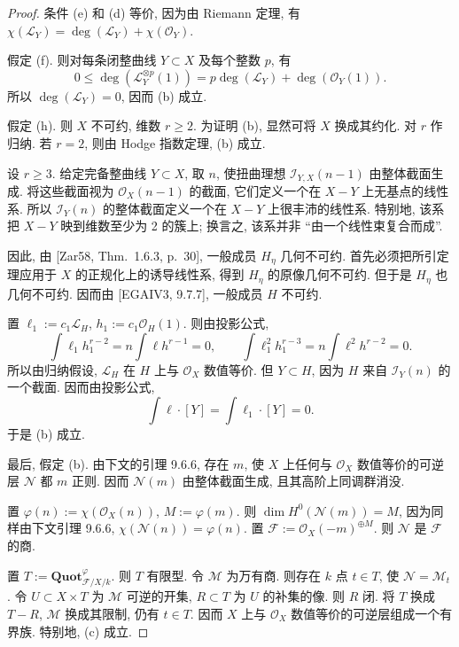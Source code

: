 \begin{proof}
条件 (e) 和 (d) 等价, 因为由 Riemann 定理, 有 $\chi(\mathcal L_Y)=\deg(\mathcal L_Y)+\chi(\mathcal O_Y)$.

假定 (f). 则对每条闭整曲线 $Y\subset X$ 及每个整数 $p$, 有
\[0\leq\deg(\mathcal L_Y^{\otimes p}(1))=p\deg(\mathcal L_Y)+\deg(\mathcal O_Y(1)).\]
所以 $\deg(\mathcal L_Y)=0$, 因而 (b) 成立.

假定 (h). 则 $X$ 不可约, 维数 $r\geq2$. 为证明 (b), 显然可将 $X$ 换成其约化. 对 $r$ 作归纳. 若 $r=2$, 则由 Hodge 指数定理, (b) 成立.

设 $r\geq3$. 给定完备整曲线 $Y\subset X$, 取 $n$, 使扭曲理想 $\mathcal I_{Y,X}(n-1)$ 由整体截面生成. 将这些截面视为 $\mathcal O_X(n-1)$ 的截面, 它们定义一个在 $X-Y$ 上无基点的线性系. 所以 $\mathcal I_Y(n)$ 的整体截面定义一个在 $X-Y$ 上很丰沛的线性系. 特别地, 该系把 $X-Y$ 映到维数至少为 2 的簇上; 换言之, 该系并非 ``由一个线性束复合而成''.

因此, 由 [Zar58, Thm.~1.6.3, p.~30], 一般成员 $H_\eta$ 几何不可约. 首先必须把所引定理应用于 $X$ 的正规化上的诱导线性系, 得到 $H_\eta$ 的原像几何不可约.
但于是 $H_\eta$ 也几何不可约. 因而由 [EGAIV3, 9.7.7], 一般成员 $H$ 不可约.

置 $\ell_1:=c_1\mathcal L_H$, $h_1:=c_1\mathcal O_H(1)$. 则由投影公式,
\[\int\ell_1h_1^{r-2}=n\int\ell h^{r-1}=0,\qquad
\int\ell_1^2h_1^{r-3}=n\int\ell^2h^{r-2}=0.\]
所以由归纳假设, $\mathcal L_H$ 在 $H$ 上与 $\mathcal O_X$ 数值等价. 但 $Y\subset H$, 因为 $H$ 来自 $\mathcal I_Y(n)$ 的一个截面. 因而由投影公式,
\[\int\ell\cdot[Y]=\int\ell_1\cdot[Y]=0.\]
于是 (b) 成立.

最后, 假定 (b). 由下文的引理 9.6.6, 存在 $m$, 使 $X$ 上任何与 $\mathcal O_X$ 数值等价的可逆层 $\mathcal N$ 都 $m$ 正则. 因而 $\mathcal N(m)$ 由整体截面生成, 且其高阶上同调群消没.

置 $\varphi(n):=\chi(\mathcal O_X(n))$, $M:=\varphi(m)$. 则 $\dim H^0(\mathcal N(m))=M$, 因为同样由下文引理 9.6.6, $\chi(\mathcal N(n))=\varphi(n)$. 置 $\mathcal F:=\mathcal O_X(-m)^{\oplus M}$. 则 $\mathcal N$ 是 $\mathcal F$ 的商.

置 $T:=\mathbf{Quot}^{\varphi}_{\mathcal F/X/k}$. 则 $T$ 有限型. 令 $\mathcal M$ 为万有商. 则存在 $k$ 点 $t\in T$, 使 $\mathcal N=\mathcal M_t$. 令 $U\subset X\times T$ 为 $\mathcal M$ 可逆的开集, $R\subset T$ 为 $U$ 的补集的像. 则 $R$ 闭. 将 $T$ 换成 $T-R$, $\mathcal M$ 换成其限制, 仍有 $t\in T$. 因而 $X$ 上与 $\mathcal O_X$ 数值等价的可逆层组成一个有界族. 特别地, (c) 成立.
\end{proof}

